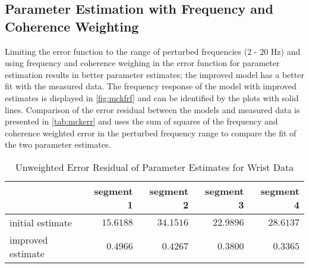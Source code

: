 \documentclass[11pt,a4paper]{article}
\begin{document}
\subsection{Parameter Estimation with Frequency and Coherence Weighting}
Limiting the error function to the range of perturbed frequencies ($2$ -
$20$ Hz) and using frequency and coherence weighing in the error function
for parameter estimation results in better parameter estimates; the improved
model has a better fit with the measured data. The frequency response of the
model with improved estimates is displayed in \autoref{fig:mckfrf} and can be
identified by the plots with solid lines. Comparison of the error residual
between the models and measured data is presented in \autoref{tab:mckerr} and
uses the sum of squares of the frequency and coherence weighted error in the
perturbed frequency range to compare the fit of the two parameter estimates.

\begin{table}
    \centering
    \begin{tabular}{|l|r|r|r|r|}
        \hline
        \nonumber & segment 1 & segment 2 & segment 3 & segment 4 \\
        \hline
        initial estimate & $15.6188$ & $34.1516$ & $22.9896$ & $28.6137$ \\
        improved estimate & $0.4966$ & $0.4267$ & $0.3800$ & $0.3365$ \\
        \hline
    \end{tabular}
    \caption{Unweighted Error Residual of Parameter Estimates for Wrist Data}
    \label{tab:mckerr}
\end{table}

\end{document}
